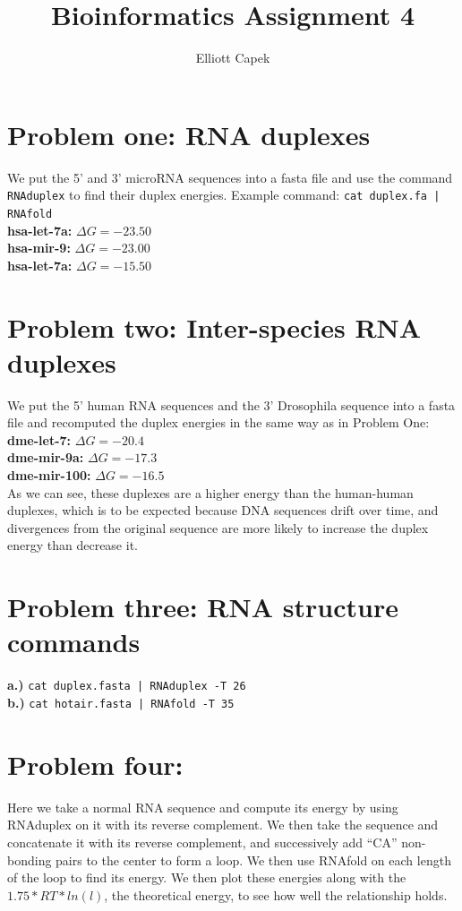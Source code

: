 \documentclass[10pt]{article} %
\title{Bioinformatics Assignment 4}
\author{Elliott Capek}
\begin{document}
\maketitle{}

\section{Problem one: RNA duplexes}
We put the 5' and 3' microRNA sequences into a fasta file and use the command
\texttt{RNAduplex} to find their duplex energies. Example command:
\texttt{cat duplex.fa | RNAfold}\\

\textbf{hsa-let-7a: } $\Delta G = -23.50$\\
\textbf{hsa-mir-9: } $\Delta G = -23.00$\\
\textbf{hsa-let-7a: } $\Delta G = -15.50$\\

\section{Problem two: Inter-species RNA duplexes}
We put the 5' human RNA sequences and the 3' Drosophila sequence into a fasta file
and recomputed the duplex energies in the same way as in Problem One:\\
\textbf{dme-let-7: } $\Delta G = -20.4$\\
\textbf{dme-mir-9a: } $\Delta G = -17.3$\\
\textbf{dme-mir-100: } $\Delta G = -16.5$\\

As we can see, these duplexes are a higher energy than the human-human duplexes, which
is to be expected because DNA sequences drift over time, and divergences from the
original sequence are more likely to increase the duplex energy than decrease it.\\

\section{Problem three: RNA structure commands}
\textbf{a.)} \texttt{cat duplex.fasta | RNAduplex -T 26}\\
\textbf{b.)} \texttt{cat hotair.fasta | RNAfold -T 35}\\

\section{Problem four: }
Here we take a normal RNA sequence and compute its energy by using RNAduplex on it with
its reverse complement. We then take the sequence and concatenate it with its reverse
complement, and successively add ``CA'' non-bonding pairs to the center to form a
loop. We then use RNAfold on each length of the loop to find its energy. We then plot
these energies along with the $1.75*RT*ln(l)$, the theoretical energy, to see how
well the relationship holds.\\
\end{document}
